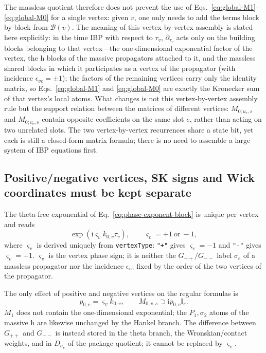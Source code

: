 \documentclass[11pt,a4paper]{article}
\newcommand{\ii}{\mathrm i}
\newcommand{\Id}{\mathbb I}
\newcommand{\cB}{\mathcal B}
\begin{document}
The massless quotient therefore does not prevent the use of Eqs.~\eqref{eq:global-M1}--\eqref{eq:global-M0} for a single vertex: given $v$, one only needs to add the terms block by block from $\cB(v)$. The meaning of this vertex-by-vertex assembly is stated here explicitly: in the time IBP with respect to $\tau_v$, $\partial_{\tau_v}$ acts only on the building blocks belonging to that vertex---the one-dimensional exponential factor of the vertex, the h blocks of the massive propagators attached to it, and the massless shared blocks in which it participates as a vertex of the propagator (with incidence $\epsilon_{ve}=\pm1$); the factors of the remaining vertices carry only the identity matrix, so Eqs.~\eqref{eq:global-M1} and \eqref{eq:global-M0} are exactly the Kronecker sum of that vertex's local atoms. What changes is not this vertex-by-vertex assembly rule but the support relation between the matrices of different vertices: $M_{0;u_e,s}$ and $M_{0;v_e,s}$ contain opposite coefficients on the same slot $e$, rather than acting on two unrelated slots. The two vertex-by-vertex recurrences share a state bit, yet each is still a closed-form matrix formula; there is no need to assemble a large system of IBP equations first.

\subsection{Positive/negative vertices, SK signs and Wick coordinates must be kept separate}

The theta-free exponential of Eq.~\eqref{eq:phase-exponent-block} is unique per vertex and reads
\begin{equation}
 \exp(\ii\varsigma_vk_{0,v}\tau_v),
 \qquad \varsigma_v=+1\ \text{or}\ -1,
 \label{eq:vertex-phase-sign}
\end{equation}
where $\varsigma_v$ is derived uniquely from \texttt{vertexType}: \texttt{"+"} gives $\varsigma_v=-1$ and \texttt{"-"} gives $\varsigma_v=+1$. $\varsigma_v$ is the vertex phase sign; it is neither the $G_{++}/G_{--}$ label $\sigma_e$ of a massless propagator nor the incidence $\epsilon_{ve}$ fixed by the order of the two vertices of the propagator.

The only effect of positive and negative vertices on the regular formulas is
\begin{equation}
 p_{0,v}=\varsigma_vk_{0,v},
 \qquad
 M_{0;v,s}\supset\ii p_{0,v}\Id_s.
 \label{eq:signed-vertex-M0}
\end{equation}
$M_1$ does not contain the one-dimensional exponential; the $P_1,\sigma_2$ atoms of the massive h are likewise unchanged by the Hankel branch. The difference between $G_{++}$ and $G_{--}$ is instead stored in the theta branch, the Wronskian/contact weights, and in $D_{\sigma_e}$ of the package quotient; it cannot be replaced by $\varsigma_v$.
\end{document}
